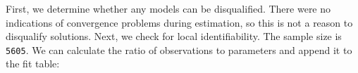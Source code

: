 \documentclass[
  man,floatsintext]{apa6}
\newenvironment{Shaded}{\begin{snugshade}}{\end{snugshade}}
\newcommand{\DecValTok}[1]{\textcolor[rgb]{0.00,0.00,0.81}{#1}}
\newcommand{\FunctionTok}[1]{\textcolor[rgb]{0.00,0.00,0.00}{#1}}
\newcommand{\NormalTok}[1]{#1}
\newcommand{\OtherTok}[1]{\textcolor[rgb]{0.56,0.35,0.01}{#1}}
\newcommand{\SpecialCharTok}[1]{\textcolor[rgb]{0.00,0.00,0.00}{#1}}
\newcommand{\StringTok}[1]{\textcolor[rgb]{0.31,0.60,0.02}{#1}}
\begin{document}
First, we determine whether any models can be disqualified.
There were no indications of convergence problems during estimation,
so this is not a reason to disqualify solutions.
Next, we check for local identifiability.
The sample size is \texttt{5605}.
We can calculate the ratio of observations to parameters and append it to the fit table:

\begin{Shaded}
\end{Shaded}
\end{document}
